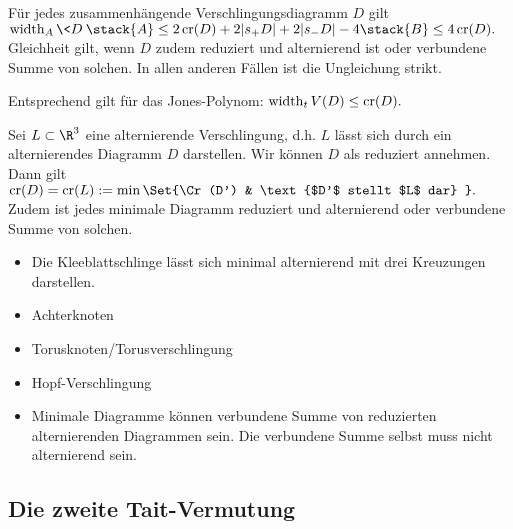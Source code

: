 \begin{st}
    Für jedes zusammenhängende Verschlingungsdiagramm $D$ gilt
    \begin{math}
        \width_A \<D\>
        \stack{A}\le 2 \Cr(D) + 2 |s_+ D| + 2|s_- D| - 4
        \stack{B}\le 4 \Cr(D).
    \end{math}
    Gleichheit gilt, wenn $D$ zudem reduziert und alternierend ist oder verbundene Summe von solchen.
    In allen anderen Fällen ist die Ungleichung strikt.

    Entsprechend gilt für das Jones-Polynom:
    \begin{math}
        \operatorname{width}_t V(D)
        \le \operatorname{cr}(D).
    \end{math}
\end{st}


\begin{kor}
    Sei $L \subset \R^3$ eine alternierende Verschlingung, d.h. $L$ lässt sich durch ein alternierendes Diagramm $D$ darstellen.
    Wir können $D$ als reduziert annehmen.
    Dann gilt
    \begin{math}
        \Cr(D) = \Cr(L) := \min \Set{\Cr(D') & \text{$D'$ stellt $L$ dar} }.
    \end{math}
    Zudem ist jedes minimale Diagramm reduziert und alternierend oder verbundene Summe von solchen.
\end{kor}

\begin{ex}
    \begin{itemize}
        \item
            Die Kleeblattschlinge lässt sich minimal alternierend mit drei Kreuzungen darstellen.
        \item
            Achterknoten
        \item
            Torusknoten/Torusverschlingung
        \item
            Hopf-Verschlingung
        \item
            Minimale Diagramme können verbundene Summe von reduzierten alternierenden Diagrammen sein.
            Die verbundene Summe selbst muss nicht alternierend sein.
    \end{itemize}
\end{ex}


\subsection{Die zweite Tait-Vermutung}

